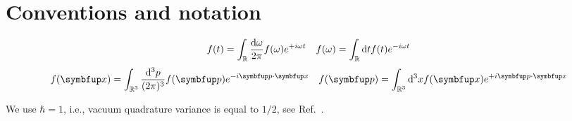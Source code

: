 \section{Conventions and notation}


\begin{align}
	f(t)
	=
	\int_{\mathbb{R}}\frac{\odif{\omega}}{2\pi}
	f(\omega)
	e^{+i\omega t}
	&&
	f(\omega)
	=
	\int_{\mathbb{R}}\odif{t}
	f(t)
	e^{-i\omega t}
\end{align}
\begin{align}
	f(\vb{x})
	=
	\int_{\mathbb{R}^3}\frac{\odif[order={3}]{p}}{(2\pi)^3}
	f(\vb{p})
	e^{-i\vb{p}\vdot\vb{x}}
	&&
	f(\vb{p})
	=
	\int_{\mathbb{R}^3}\odif[order={3}]{x}
	f(\vb{x})
	e^{+i\vb{p}\vdot\vb{x}}
\end{align}

We use $\hbar=1$, i.e., vacuum quadrature variance is equal to $1/2$, see Ref.~\cite[p.~4]{Weedbrook2012}.